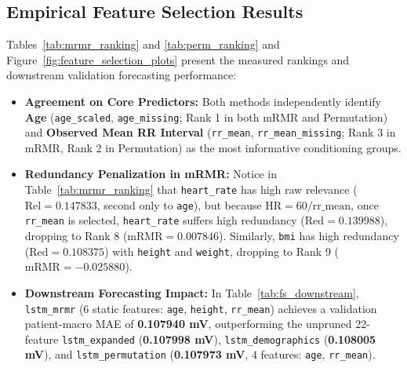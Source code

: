 \documentclass[11pt,a4paper]{article}
\begin{document}
\subsection{Empirical Feature Selection Results}
Tables~\ref{tab:mrmr_ranking} and \ref{tab:perm_ranking} and Figure~\ref{fig:feature_selection_plots} present the measured rankings and downstream validation forecasting performance:
\begin{itemize}
    \item \textbf{Agreement on Core Predictors:} Both methods independently identify \textbf{Age} (\texttt{age\_scaled}, \texttt{age\_missing}; Rank 1 in both mRMR and Permutation) and \textbf{Observed Mean RR Interval} (\texttt{rr\_mean}, \texttt{rr\_mean\_missing}; Rank 3 in mRMR, Rank 2 in Permutation) as the most informative conditioning groups.
    \item \textbf{Redundancy Penalization in mRMR:} Notice in Table~\ref{tab:mrmr_ranking} that \texttt{heart\_rate} has high raw relevance ($\text{Rel} = 0.147833$, second only to \texttt{age}), but because $\text{HR} = 60 / \text{rr\_mean}$, once \texttt{rr\_mean} is selected, \texttt{heart\_rate} suffers high redundancy ($\text{Red} = 0.139988$), dropping to Rank 8 ($\text{mRMR} = 0.007846$). Similarly, \texttt{bmi} has high redundancy ($\text{Red} = 0.108375$) with \texttt{height} and \texttt{weight}, dropping to Rank 9 ($\text{mRMR} = -0.025880$).
    \item \textbf{Downstream Forecasting Impact:} In Table~\ref{tab:fs_downstream}, \texttt{lstm\_mrmr} ($6$ static features: \texttt{age}, \texttt{height}, \texttt{rr\_mean}) achieves a validation patient-macro MAE of \textbf{0.107940 mV}, outperforming the unpruned 22-feature \texttt{lstm\_expanded} (\textbf{0.107998 mV}), \texttt{lstm\_demographics} (\textbf{0.108005 mV}), and \texttt{lstm\_permutation} (\textbf{0.107973 mV}, $4$ features: \texttt{age}, \texttt{rr\_mean}).
\end{itemize}
\end{document}
